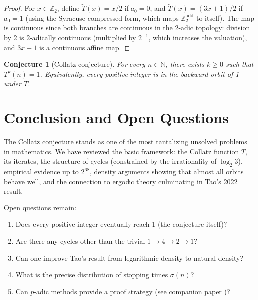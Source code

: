 \documentclass[12pt,a4paper]{article}
\newtheorem{conjecture}[theorem]{Conjecture}
\begin{document}
\begin{proof}
For $x \in \mathbb{Z}_2$, define $\tilde{T}(x) = x/2$ if $a_0 = 0$, and
$\tilde{T}(x) = (3x+1)/2$ if $a_0 = 1$ (using the Syracuse compressed form, which maps
$\mathbb{Z}_2^{\text{odd}}$ to itself). The map is continuous since both branches are
continuous in the 2-adic topology: division by 2 is $2$-adically continuous (multiplied
by $2^{-1}$, which increases the valuation), and $3x+1$ is a continuous affine map.
\end{proof}

\begin{conjecture}[Collatz conjecture]\label{conj:collatz}
For every $n \in \mathbb{N}$, there exists $k \geq 0$ such that $T^k(n) = 1$.
Equivalently, every positive integer is in the backward orbit of 1 under $T$.
\end{conjecture}

\section{Conclusion and Open Questions}

The Collatz conjecture stands as one of the most tantalizing unsolved problems in
mathematics. We have reviewed the basic framework: the Collatz function $T$, its
iterates, the structure of cycles (constrained by the irrationality of $\log_2 3$),
empirical evidence up to $2^{68}$, density arguments showing that almost all orbits
behave well, and the connection to ergodic theory culminating in Tao's 2022 result.

Open questions remain:
\begin{enumerate}
  \item Does every positive integer eventually reach 1 (the conjecture itself)?
  \item Are there any cycles other than the trivial $1 \to 4 \to 2 \to 1$?
  \item Can one improve Tao's result from logarithmic density to natural density?
  \item What is the precise distribution of stopping times $\sigma(n)$?
  \item Can $p$-adic methods provide a proof strategy (see companion paper \cite{Fuhrmann2026b})?
\end{enumerate}
\end{document}
